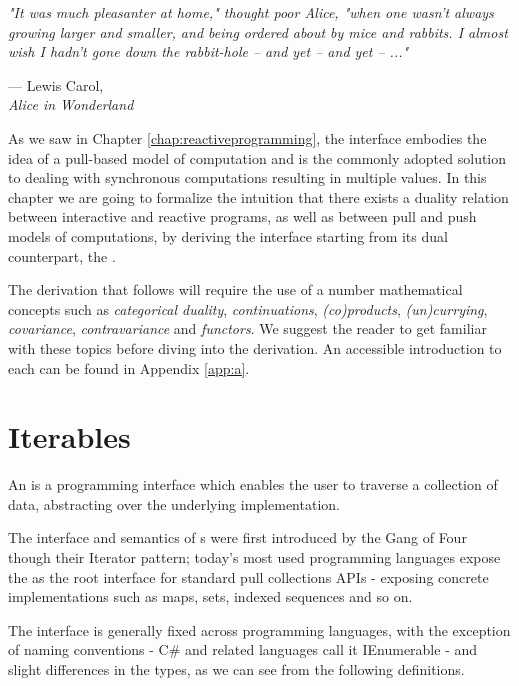 \let\textcircled=\pgftextcircled
{}

\epigraph{\hspace{4ex}\textit{"It was much pleasanter at home," thought poor Alice, "when one wasn't always growing larger and smaller, and being ordered about by mice and rabbits. I almost wish I hadn't gone down the rabbit-hole -- and yet -- and yet -- ..."}}{--- Lewis Carol,\\ \textit{Alice in Wonderland}}

As we saw in Chapter \ref{chap:reactiveprogramming}, the  interface embodies the idea of a pull-based model of computation and is the commonly adopted solution to dealing with synchronous computations resulting in multiple values. In this chapter we are going to formalize the intuition that there exists a duality relation between interactive and reactive programs, as well as between pull and push models of computations, by deriving the  interface starting from its dual counterpart, the .

The derivation that follows will require the use of a number mathematical concepts such as \textit{categorical duality}, \textit{continuations}, \textit{(co)products}, \textit{(un)currying}, \textit{covariance}, \textit{contravariance} and \textit{functors}. We suggest the reader to get familiar with these topics before diving into the derivation. An accessible introduction to each can be found in Appendix \ref{app:a}.

\section{Iterables}
\label{sec:iterables}

An  is a programming interface which enables the user to traverse a collection of data, abstracting over the underlying implementation\cite{gamma1995design}.

The interface and semantics of s were first introduced by the Gang of Four though their Iterator pattern\cite{gamma1995design}; today's most used programming languages expose the  as the root interface for standard pull collections APIs - exposing concrete implementations such as maps, sets, indexed sequences and so on. 

The  interface is generally fixed across programming languages, with the exception of naming conventions - C\# and related languages call it IEnumerable - and slight differences in the types, as we can see from the following definitions.\\

